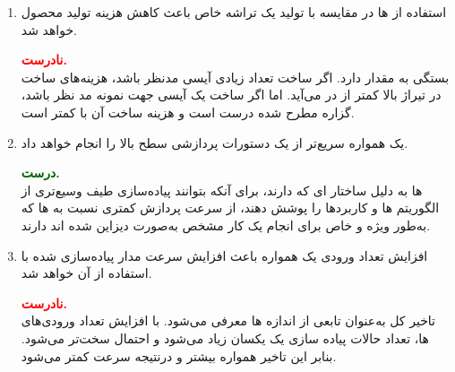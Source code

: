 \begin{enumerate}
\begin{qsolve}
	\end{qsolve}
	
	
	
	
	\item 
	استفاده از ها در مقایسه با تولید یک تراشه خاص باعث کاهش هزینه تولید محصول خواهد شد.
	\begin{qsolve}
		\textbf{\textcolor{red}{نادرست.}}\\
		بستگی به مقدار  دارد. اگر ساخت تعداد زیادی آیسی مدنظر باشد، هزینه‌های ساخت  در تیراژ بالا کمتر از  در می‌آید. اما اگر ساخت یک آیسی جهت نمونه مد نظر باشد، گزاره مطرح شده درست است و هزینه ساخت آن با  کمتر است.
	
	\end{qsolve}
	
	
	
	
	\item 
	یک  همواره سریع‌تر از یک  دستورات پردازشی سطح بالا را انجام خواهد داد.
	\begin{qsolve}
		\textbf{\textcolor{darkgreen}{درست.}}\\
		\lr{FPGA}
		ها به دلیل ساختار  ای که دارند، برای آنکه بتوانند پیاده‌سازی طیف وسیع‌تری از الگوریتم ها و کاربرد‌ها را پوشش دهند، از سرعت پردازش کمتری نسبت به  ها که به‌طور ویژه و خاص برای انجام یک کار مشخص به‌صورت  دیزاین شده اند دارند.
		
	\end{qsolve}
	
	
	
	\item 
	افزایش تعداد ورودی یک  همواره باعث افزایش سرعت مدار پیاده‌سازی شده با استفاده از آن خواهد شد.
	\begin{qsolve}
		\textbf{\textcolor{red}{نادرست.}}\\
		تاخیر کل  به‌عنوان تابعی از اندازه  ها معرفی می‌شود. با افزایش تعداد ورودی‌های  ها، تعداد حالات پیاده سازی یک  یکسان زیاد می‌شود و احتمال  سخت‌تر می‌شود. بنابر این تاخیر همواره بیشتر و درنتیجه سرعت کمتر می‌شود.
	\end{qsolve}
	
	
	

\end{enumerate}
